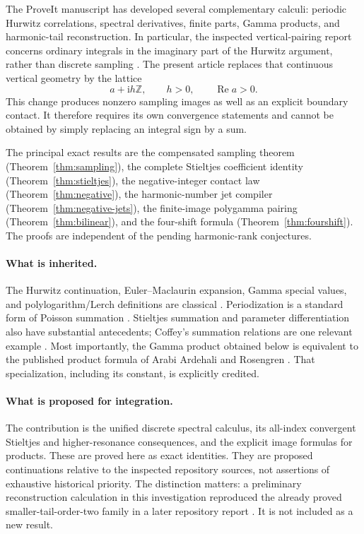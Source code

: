 \documentclass[11pt,a4paper]{article}
\numberwithin{equation}{section}
\theoremstyle{definition}
\theoremstyle{remark}
\DeclareMathOperator{\Ree}{Re}
\newcommand{\ii}{\mathrm i}
\newcommand{\Z}{\mathbb Z}
\begin{document}
The ProveIt manuscript has developed several complementary calculi:
periodic Hurwitz correlations, spectral derivatives, finite parts,
Gamma products, and harmonic-tail reconstruction. In particular, the
inspected vertical-pairing report concerns ordinary integrals in the
imaginary part of the Hurwitz argument, rather than discrete sampling
\cite{RepoVertical}. The present article replaces that continuous
vertical geometry by the lattice
\[
 a+\ii h\Z,\qquad h>0,\qquad \Ree a>0.
\]
This change produces nonzero sampling images as well as an explicit
boundary contact. It therefore requires its own convergence statements
and cannot be obtained by simply replacing an integral sign by a sum.

The principal exact results are the compensated sampling theorem
(Theorem~\ref{thm:sampling}), the complete Stieltjes coefficient identity
(Theorem~\ref{thm:stieltjes}), the negative-integer contact law
(Theorem~\ref{thm:negative}), the harmonic-number jet compiler
(Theorem~\ref{thm:negative-jets}), the finite-image polygamma pairing
(Theorem~\ref{thm:bilinear}), and the four-shift formula
(Theorem~\ref{thm:fourshift}). The proofs are independent of the pending
harmonic-rank conjectures.

\paragraph{What is inherited.}
The Hurwitz continuation, Euler--Maclaurin expansion, Gamma special
values, and polylogarithm/Lerch definitions are classical
\cite{DLMF25,DLMF5,DLMFPoly,DLMFLerch}. Periodization is a standard
form of Poisson summation \cite{DLMFFourier}. Stieltjes summation and
parameter differentiation also have substantial antecedents; Coffey's
summation relations are one relevant example \cite{Coffey}. Most
importantly, the Gamma product obtained below is equivalent to the
published product formula of Arabi Ardehali and Rosengren
\cite[Eq.~(13)]{ArdehaliRosengren}. That specialization, including its
constant, is explicitly credited.

\paragraph{What is proposed for integration.}
The contribution is the unified discrete spectral calculus, its
all-index convergent Stieltjes and higher-resonance consequences, and the
explicit image formulas for products. These are proved here as exact
identities. They are proposed continuations relative to the inspected
repository sources, not assertions of exhaustive historical priority.
The distinction matters: a preliminary reconstruction calculation in
this investigation reproduced the already proved smaller-tail-order-two
family in a later repository report \cite{RepoBernoulli}. It is not
included as a new result.
\end{document}
